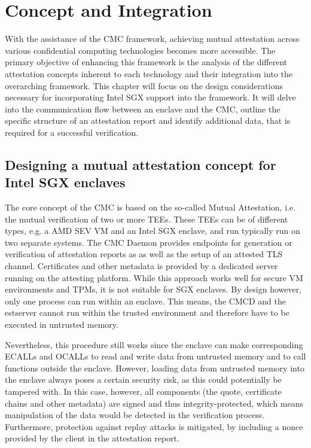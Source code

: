 
\chapter{Concept and Integration}\label{chapter:integration}

With the assistance of the CMC framework, achieving mutual attestation across various confidential computing technologies becomes more accessible. The primary objective of enhancing this framework is the analysis of the different attestation concepts inherent to each technology and their integration into the overarching framework. This chapter will focus on the design considerations necessary for incorporating Intel SGX support into the framework. It will delve into the communication flow between an enclave and the CMC, outline the specific structure of an attestation report and identify additional data, that is required for a successful verification.

\section{Designing a mutual attestation concept for Intel SGX enclaves}
The core concept of the CMC is based on the so-called Mutual Attestation, i.e. the mutual verification of two or more TEEs. These TEEs can be of different types, e.g. a AMD SEV VM and an Intel SGX enclave, and run typically run on two separate systems.
The CMC Daemon provides endpoints for generation or verification of attestation reports as as well as the setup of an attested TLS channel. Certificates and other metadata is provided by a dedicated server running on the attesting platform.
While this approach works well for secure VM environments and TPMs, it is not suitable for SGX enclaves. By design however, only one process can run within an enclave. This means, the CMCD and the estserver cannot run within the trusted environment and therefore have to be executed in untrusted memory. 

Nevertheless, this procedure still works since the enclave can make corresponding ECALLs and OCALLs to read and write data from untrusted memory and to call functions outside the enclave. However, loading data from untrusted memory into the enclave always poses a certain security risk, as this could potentially be tampered with.  
In this case, however, all components (the quote, certificate chains and other metadata) are signed and thus integrity-protected, which means manipulation of the data would be detected in the verification process. Furthermore, protection against replay attacks is mitigated, by including a nonce provided by the client in the attestation report. 

